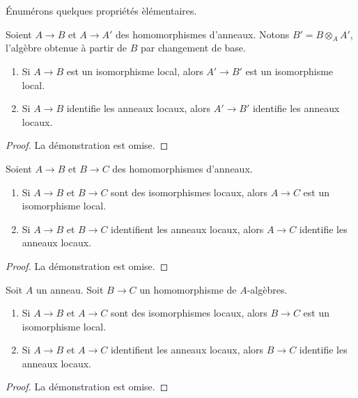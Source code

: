 \noindent
\'Enum\'erons quelques propri\'et\'es \`el\'ementaires.

\begin{lemma}
\label{lemma-base-change-local-isomorphism}
Soient $A \to B$ et $A \to A'$ des homomorphismes d'anneaux. Notons $B' = B \otimes_A A'$,
l'alg\`ebre obtenue \`a partir de $B$ par changement de base.
\begin{enumerate}
\item Si $A \to B$ est un isomorphisme local, alors $A' \to B'$ est un
isomorphisme local.
\item Si $A \to B$ identifie les anneaux locaux, alors $A' \to B'$
identifie les anneaux locaux.
\end{enumerate}
\end{lemma}

\begin{proof}
La d\'emonstration est omise.
\end{proof}

\begin{lemma}
\label{lemma-composition-local-isomorphism}
Soient $A \to B$ et $B \to C$ des homomorphismes d'anneaux.
\begin{enumerate}
\item Si $A \to B$ et $B \to C$ sont des isomorphismes locaux, alors $A \to C$
est un isomorphisme local.
\item Si $A \to B$ et $B \to C$ identifient les anneaux locaux, alors $A \to C$
identifie les anneaux locaux.
\end{enumerate}
\end{lemma}

\begin{proof}
La d\'emonstration est omise.
\end{proof}

\begin{lemma}
\label{lemma-local-isomorphism-permanence}
Soit $A$ un anneau. Soit $B \to C$ un homomorphisme de $A$-alg\`ebres.
\begin{enumerate}
\item Si $A \to B$ et $A \to C$ sont des isomorphismes locaux, alors $B \to C$
est un isomorphisme local.
\item Si $A \to B$ et $A \to C$ identifient les anneaux locaux, alors $B \to C$
identifie les anneaux locaux.
\end{enumerate}
\end{lemma}

\begin{proof}
La d\'emonstration est omise.
\end{proof}

